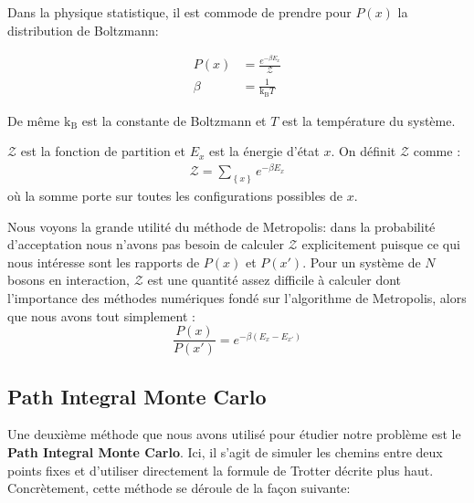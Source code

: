 \documentclass[11pt]{article}
\theoremstyle{definition}
\theoremstyle{remark}
\begin{document}
Dans la physique statistique, il est commode de prendre pour $P(x)$ la distribution de Boltzmann: 

\begin{align} 
\label{boltzmann_dist}
P(x) &= \frac{e^{-\beta E_x}}{\mathcal{Z}} \\
\beta &= \frac{1}{\mathrm{k_B}T}
\end{align}


De même $\mathrm{k_B}$ est la constante de Boltzmann et $T$ est la température du système. 

$\mathcal{Z}$ est la fonction de partition et $E_x$ est la énergie d'état $x$. 
On définit $\mathcal{Z}$ comme : 
\begin{align}
\label{partition}
\mathcal{Z}=\sum_{\left\lbrace x \right\rbrace} e^{-\beta E_x}
\end{align}
où la somme porte sur toutes les configurations possibles de $x$.

 Nous voyons la grande utilité du méthode de Metropolis: dans la probabilité d'acceptation nous n'avons pas besoin de calculer $\mathcal{Z}$ explicitement puisque ce qui nous intéresse sont les rapports de $P(x)$ et $P(x')$. Pour un système de $N$ bosons en interaction, $\mathcal{Z}$ est une quantité assez difficile à calculer dont l'importance des méthodes numériques fondé sur l'algorithme de Metropolis, alors que nous avons tout simplement :
\begin{equation}
 	\frac{P(x)}{P(x')}=e^{-\beta (E_x-E_{x'})}
\end{equation}


\subsection{Path Integral Monte Carlo}

Une deuxième méthode que nous avons utilisé pour étudier notre problème est le \textbf{Path Integral Monte Carlo}. Ici, il s'agit de simuler les chemins entre deux points fixes et d'utiliser directement la formule de Trotter décrite plus haut. Concrètement, cette méthode se déroule de la façon suivante: 
\end{document}
